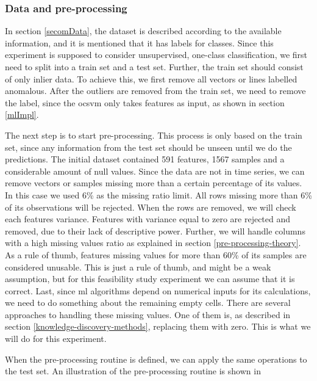 \documentclass[english, a4paper]{report}
\begin{document}
{{{            \subsubsection{Data and pre-processing} \label{secomADdpp}
            {
                In section \ref{secomData}, the dataset is described according to the available information, and it is mentioned that it has labels for classes. Since this experiment is supposed to consider unsupervised, one-class classification, we first need to split into a train set and a test set. Further, the train set should consist of only inlier data. To achieve this, we first remove all vectors or lines labelled anomalous. After the outliers are removed from the train set, we need to remove the label, since the \gls{ocsvm} only takes features as input, as shown in section \ref{mlImpl}. 
                \par
                The next step is to start pre-processing. This process is only based on the train set, since any information from the test set should be unseen until we do the predictions. The initial dataset contained 591 features, 1567 samples and a considerable amount of null values. Since the data are not in time series, we can remove vectors or samples missing more than a certain percentage of its values. In this case we used 6\% as the missing ratio limit. All rows missing more than 6\% of its observations will be rejected. When the rows are removed, we will check each features variance. Features with variance equal to zero are rejected and removed, due to their lack of descriptive power. Further, we will handle columns with a high missing values ratio as explained in section \ref{pre-processing-theory}. As a rule of thumb, features missing values for more than 60\% of its samples are considered unusable. This is just a rule of thumb, and might be a weak assumption, but for this feasibility study experiment we can assume that it is correct. Last, since \gls{ml} algorithms depend on numerical inputs for its calculations, we need to do something about the remaining empty cells. There are several approaches to handling these missing values. One of them is, as described in section \ref{knowledge-discovery-methods}, replacing them with zero. This is what we will do for this experiment.
                \par
                When the pre-processing routine is defined, we can apply the same operations to the test set. An illustration of the pre-processing routine is shown in 
                
}}}}
\end{document}
